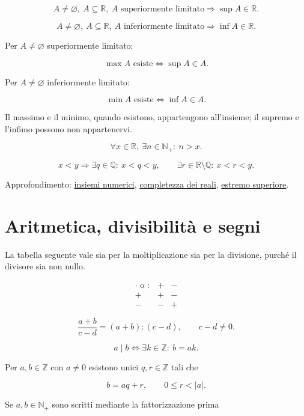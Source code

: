 \[
A\ne\varnothing,\ A\subseteq\mathbb R,\ A\text{ superiormente limitato}
\Longrightarrow
\sup A\in\mathbb R.
\]

\[
A\ne\varnothing,\ A\subseteq\mathbb R,\ A\text{ inferiormente limitato}
\Longrightarrow
\inf A\in\mathbb R.
\]

Per \(A\ne\varnothing\) superiormente limitato:

\[
\max A\text{ esiste}
\Longleftrightarrow
\sup A\in A.
\]

Per \(A\ne\varnothing\) inferiormente limitato:

\[
\min A\text{ esiste}
\Longleftrightarrow
\inf A\in A.
\]

Il massimo e il minimo, quando esistono, appartengono all'insieme; il supremo e l'infimo possono non appartenervi.

\[
\forall x\in\mathbb R,\ \exists n\in\mathbb N_+:\ n>x.
\]

\[
x<y
\Longrightarrow
\exists q\in\mathbb Q:\ x<q<y,
\qquad
\exists r\in\mathbb R\setminus\mathbb Q:\ x<r<y.
\]

Approfondimento: \href{https://ingegnerismo.it/matematica/insiemi-numerici/}{insiemi numerici}, \href{https://ingegnerismo.it/matematica/completezza-dei-reali/}{completezza dei reali}, \href{https://ingegnerismo.it/matematica/estremo-superiore/}{estremo superiore}.

\section{Aritmetica, divisibilità e segni}\label{aritmetica-divisibilituxe0-e-segni}

La tabella seguente vale sia per la moltiplicazione sia per la divisione, purché il divisore sia non nullo.

\[
\begin{array}{c|cc}
\cdot\text{ o }:&+&-\\
\hline
+&+&-\\
-&-&+
\end{array}
\]

\[
\frac{a+b}{c-d}=(a+b):(c-d),
\qquad c-d\ne0.
\]

\[
a\mid b
\Longleftrightarrow
\exists k\in\mathbb Z:\ b=ak.
\]

Per \(a,b\in\mathbb Z\) con \(a\ne0\) esistono unici \(q,r\in\mathbb Z\) tali che

\[
b=aq+r,
\qquad
0\le r<|a|.
\]

Se \(a,b\in\mathbb N_+\) sono scritti mediante la fattorizzazione prima

